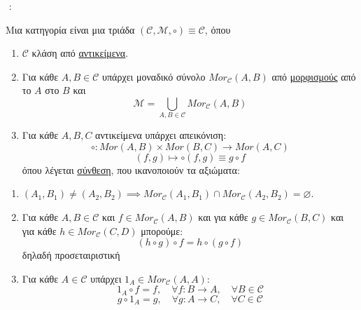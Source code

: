 
$ $\newline
{}:

\begin{defn} Μια κατηγορία είναι μια τριάδα $(\mathcal{C}, \mathcal{M}, \circ) \equiv \mathcal{C}$, όπου
    \begin{enumerate}
        \item $\mathcal{C}$ κλάση από \underline{αντικείμενα}.
        \item Για κάθε $A, B \in \mathcal{C}$ υπάρχει μοναδικό σύνολο $Mor_{\mathcal{C}}(A,B)$ από \underline{μορφισμούς} από το $A$ στο $B$ και
        $$\mathcal{M} = \bigcup\limits_{A,B \in \mathcal{C}} Mor_{\mathcal{C}} (A,B)$$

        \item Για κάθε $A,B,C$ αντικείμενα υπάρχει απεικόνιση:
        $$\circ : Mor(A,B) \times Mor(B,C) \longrightarrow Mor(A,C)$$
        $$(f,g) \longmapsto \circ(f,g) \equiv g\circ f$$ όπου λέγεται \underline{σύνθεση}, που ικανοποιούν τα αξιώματα:
    \end{enumerate}

    \begin{enumerate}
        \item $(A_1,B_1) \neq (A_2, B_2) \implies Mor_{\mathcal{C}} (A_1, B_1) \cap Mor_{\mathcal{C}}(A_2,B_2) = \varnothing$.
        \item Για κάθε $A,B \in \mathcal{C}$ και $f \in Mor_{\mathcal{C}}(A,B)$ και για κάθε $g \in Mor_{\mathcal{C}}(B,C)$ και για κάθε $h \in Mor_{\mathcal{C}} (C,D)$ μπορούμε:
        $$(h\circ g)\circ f = h\circ(g\circ f)$$ δηλαδή προσεταιριστική

        \item Για κάθε $A \in \mathcal{C}$ υπάρχει $1_A \in Mor_{\mathcal{C}}(A,A):$
        $$1_A \circ f = f, \quad \forall f: B \rightarrow A, \quad \forall B \in \mathcal{C}$$
        $$g\circ 1_A = g, \quad \forall g : A\rightarrow C, \quad \forall C \in \mathcal{C}$$

    \end{enumerate}

\end{defn}

